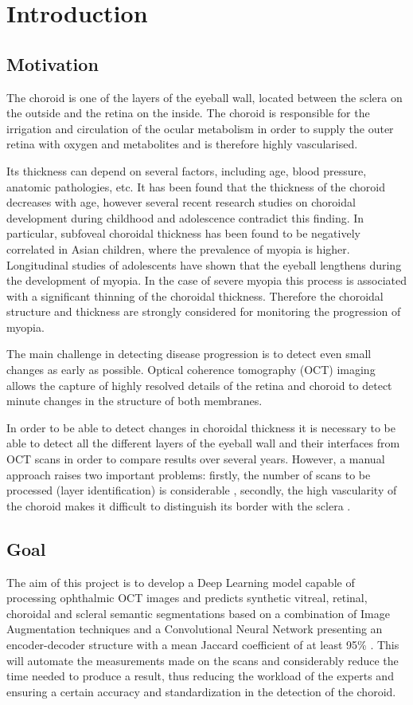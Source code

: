 \documentclass[12pt,a4paper]{scrartcl}
\begin{document}
\section{Introduction}\label{s:introduction} 
\subsection{Motivation}
The choroid is one of the layers of the eyeball wall, located between the sclera on the outside and the retina on the inside. The choroid is responsible for the irrigation and circulation of the ocular metabolism in order to supply the outer retina with oxygen and metabolites and is therefore highly vascularised. \cite{choroidExpl}

Its thickness can depend on several factors, including age, blood pressure, anatomic pathologies, etc. It has been found that the thickness of the choroid decreases with age, however several recent research studies on choroidal development during childhood and adolescence contradict this finding. In particular, subfoveal choroidal thickness has been found to be negatively correlated in Asian children, where the prevalence of myopia is higher. Longitudinal studies of adolescents have shown that the eyeball lengthens during the development of myopia. In the case of severe myopia this process is associated with a significant thinning of the choroidal thickness. Therefore the choroidal structure and thickness are strongly considered for monitoring the progression of myopia.\cite{ronchetti2019}

The main challenge in detecting disease progression is to detect even small changes as early as possible. Optical coherence tomography (OCT) imaging allows the capture of highly resolved details of the retina and choroid to detect minute changes in the structure of both membranes.\cite{ronchetti2019}

In order to be able to detect changes in choroidal thickness it is necessary to be able to detect all the different layers of the eyeball wall and their interfaces from OCT scans in order to compare results over several years. 
However, a manual approach raises two important problems: firstly, the number of scans to be processed (layer identification) is considerable \cite{Maloca2019}, secondly, the high vascularity of the choroid makes it difficult to distinguish its border with the sclera \cite{ronchetti2019}.

\subsection{Goal}
The aim of this project is to develop a Deep Learning model capable of processing  ophthalmic  OCT  images  and predicts  synthetic  vitreal,  retinal,  choroidal  and  scleral  semantic  segmentations  based  on  a  combination  of  Image  Augmentation  techniques  and  a Convolutional Neural Network presenting an encoder-decoder structure with a mean Jaccard coefficient of at least 95\%   \cite{Maloca2019}. This will automate the measurements made on the scans and considerably reduce the time needed to produce a result, thus reducing the workload of the experts and ensuring a certain accuracy and standardization in the detection of the choroid. 
\end{document}
